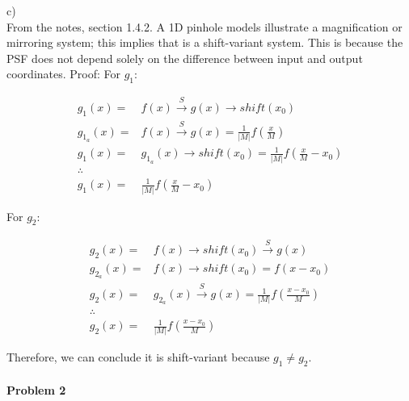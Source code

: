 \documentclass[11pt]{article}
\begin{document}
\begin{flushleft}
c) \\
From the notes, section 1.4.2. A 1D pinhole models illustrate a magnification or mirroring system; this implies that is a shift-variant system.
This is because the PSF does not depend solely on the difference between input and output coordinates.
\newline \newline
Proof: 
\newline \newline
For $g_1:$
\end{flushleft}   
\begin{equation*}
\begin{split}
    g_1(x)          = &f(x) \xrightarrow{S} g(x) \rightarrow shift(x_0)\\
    g_{1_a}(x)      = &f(x) \xrightarrow{S} g(x) = \frac{1}{|M|} f(\frac{x}{M}) \\
    g_1(x)          = &g_{1_a}(x)  \rightarrow shift(x_0)  = \frac{1}{|M|} f(\frac{x}{M} - x_0) \\
    \therefore{} & \\
    g_1(x) = & \frac{1}{|M|} f(\frac{x}{M} - x_0)  
\end{split}
\end{equation*}
\begin{flushleft}
For $g_2:$
\end{flushleft} 
\begin{equation*}
\begin{split}
    g_2(x)          = &f(x) \rightarrow shift(x_0) \xrightarrow{S} g(x)\\
    g_{2_a}(x)      = & f(x) \rightarrow shift(x_0)    =  f(x - x_0) \\
    g_2(x)          = & g_{2_a}(x)   \xrightarrow{S} g(x) =  \frac{1}{|M|} f(\frac{x - x_0}{M}) \\
    \therefore{} & \\
    g_2(x) = & \frac{1}{|M|} f(\frac{x - x_0}{M})  
\end{split}
\end{equation*}
\begin{flushleft}
Therefore, we can conclude it is shift-variant because $g_1 \neq g_2$.
\end{flushleft} 

\paragraph{\noindent\textbf{\LARGE{Problem 2}}}
\end{document}
